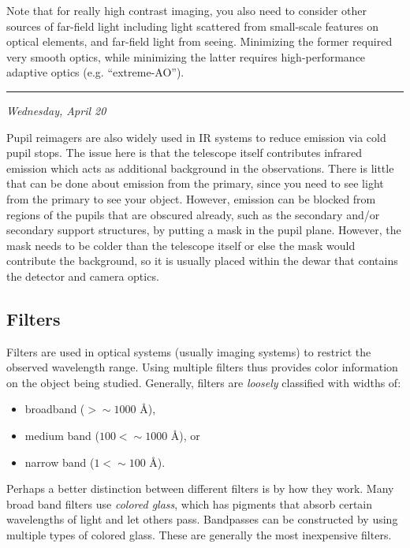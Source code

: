 \documentclass[12pt]{article}
\begin{document}
Note that for really high contrast imaging, you also need to consider
other sources of far-field light including light scattered from
small-scale features on optical elements, and far-field light from
seeing. Minimizing the former required very smooth optics, while
minimizing the latter requires high-performance adaptive optics (e.g.
``extreme-AO'').

\rule{\textwidth}{0.4pt}

{\small\hfill\emph{Wednesday, April 20}}

Pupil reimagers are also widely used in IR systems to reduce emission
via cold pupil stops. The issue here is that the telescope itself
contributes infrared emission which acts as additional background in
the observations. There is little that can be done about emission from the
primary, since you need to see light from the primary to see your
object. However, emission can be blocked from regions of the pupils
that are obscured already, such as the secondary and/or
secondary support structures, by putting a mask in the pupil plane.
However, the mask needs to be colder than the
telescope itself or else the mask would contribute the background, so
it is usually placed within the dewar that contains the detector and
camera optics.

\subsection{Filters}
Filters are used in optical systems (usually imaging systems) to
restrict the observed wavelength range. Using multiple filters thus
provides color information on the object being studied. Generally,
filters are \emph{loosely} classified with widths of:
\begin{itemize}
    \item broadband ($ > \sim 1000$ \AA{}),
    \item medium band ($100 < \sim 1000$ \AA{}), or
    \item narrow band ($1 < \sim 100$ \AA{}).
\end{itemize}

Perhaps a better distinction between different filters is by
how they work.
Many broad band filters use \emph{colored
glass}, which has pigments that absorb certain wavelengths of light
and let others pass. Bandpasses can be constructed by using multiple
types of colored glass. These are generally the most inexpensive
filters.
\end{document}
